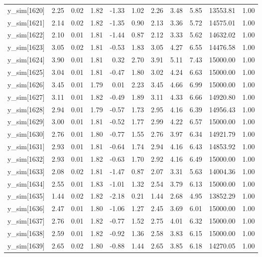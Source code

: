 \begin{table}[ht]
\begin{tabular}{rrrrrrrrrrr}
  y\_sim[1620] & 2.25 & 0.02 & 1.82 & -1.33 & 1.02 & 2.26 & 3.48 & 5.85 & 13553.81 & 1.00 \\ 
  y\_sim[1621] & 2.14 & 0.02 & 1.82 & -1.35 & 0.90 & 2.13 & 3.36 & 5.72 & 14575.01 & 1.00 \\ 
  y\_sim[1622] & 2.10 & 0.01 & 1.81 & -1.44 & 0.87 & 2.12 & 3.33 & 5.62 & 14632.02 & 1.00 \\ 
  y\_sim[1623] & 3.05 & 0.02 & 1.81 & -0.53 & 1.83 & 3.05 & 4.27 & 6.55 & 14476.58 & 1.00 \\ 
  y\_sim[1624] & 3.90 & 0.01 & 1.81 & 0.32 & 2.70 & 3.91 & 5.11 & 7.43 & 15000.00 & 1.00 \\ 
  y\_sim[1625] & 3.04 & 0.01 & 1.81 & -0.47 & 1.80 & 3.02 & 4.24 & 6.63 & 15000.00 & 1.00 \\ 
  y\_sim[1626] & 3.45 & 0.01 & 1.79 & 0.01 & 2.23 & 3.45 & 4.66 & 6.99 & 15000.00 & 1.00 \\ 
  y\_sim[1627] & 3.11 & 0.01 & 1.82 & -0.49 & 1.89 & 3.11 & 4.33 & 6.66 & 14920.80 & 1.00 \\ 
  y\_sim[1628] & 2.94 & 0.01 & 1.79 & -0.57 & 1.73 & 2.95 & 4.16 & 6.39 & 14956.43 & 1.00 \\ 
  y\_sim[1629] & 3.00 & 0.01 & 1.81 & -0.52 & 1.77 & 2.99 & 4.22 & 6.57 & 15000.00 & 1.00 \\ 
  y\_sim[1630] & 2.76 & 0.01 & 1.80 & -0.77 & 1.55 & 2.76 & 3.97 & 6.34 & 14921.79 & 1.00 \\ 
  y\_sim[1631] & 2.93 & 0.01 & 1.81 & -0.64 & 1.74 & 2.94 & 4.16 & 6.43 & 14853.92 & 1.00 \\ 
  y\_sim[1632] & 2.93 & 0.01 & 1.82 & -0.63 & 1.70 & 2.92 & 4.16 & 6.49 & 15000.00 & 1.00 \\ 
  y\_sim[1633] & 2.08 & 0.02 & 1.81 & -1.47 & 0.87 & 2.07 & 3.31 & 5.63 & 14004.36 & 1.00 \\ 
  y\_sim[1634] & 2.55 & 0.01 & 1.83 & -1.01 & 1.32 & 2.54 & 3.79 & 6.13 & 15000.00 & 1.00 \\ 
  y\_sim[1635] & 1.44 & 0.02 & 1.82 & -2.18 & 0.21 & 1.44 & 2.68 & 4.95 & 13852.29 & 1.00 \\ 
  y\_sim[1636] & 2.47 & 0.01 & 1.80 & -1.06 & 1.27 & 2.45 & 3.69 & 6.01 & 15000.00 & 1.00 \\ 
  y\_sim[1637] & 2.76 & 0.01 & 1.82 & -0.77 & 1.52 & 2.75 & 4.01 & 6.32 & 15000.00 & 1.00 \\ 
  y\_sim[1638] & 2.59 & 0.01 & 1.82 & -0.92 & 1.36 & 2.58 & 3.83 & 6.15 & 15000.00 & 1.00 \\ 
  y\_sim[1639] & 2.65 & 0.02 & 1.80 & -0.88 & 1.44 & 2.65 & 3.85 & 6.18 & 14270.05 & 1.00 \\ 

\end{tabular}
\end{table}
